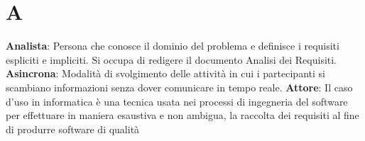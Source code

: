 \section{A}
\textbf{Analista}: Persona che conosce il dominio del problema e definisce i requisiti espliciti e impliciti. Si occupa di redigere il documento Analisi dei Requisiti.\\
\textbf{Asincrona}: Modalità di svolgimento delle attività in cui i partecipanti si scambiano informazioni senza dover comunicare in tempo reale.
\textbf{Attore}: Il caso d'uso in informatica è una tecnica usata nei processi di ingegneria del software per effettuare in maniera esaustiva e non ambigua, la raccolta dei requisiti al fine di produrre software di qualità\\
